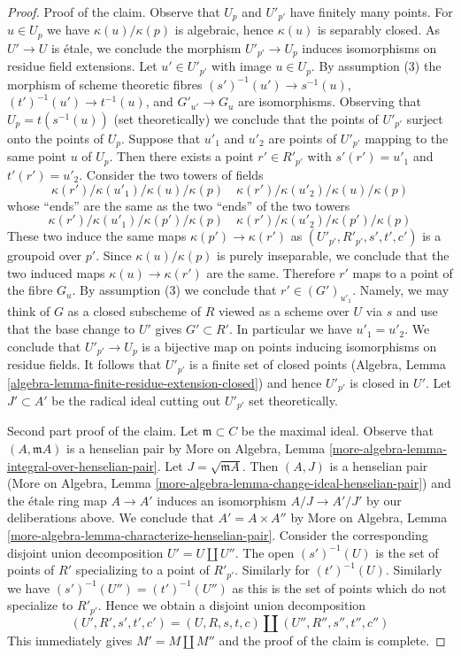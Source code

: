 \begin{proof}
\medskip\noindent
Proof of the claim. Observe that $U_p$ and $U'_{p'}$ have finitely many points.
For $u \in U_p$ we have $\kappa(u)/\kappa(p)$ is algebraic,
hence $\kappa(u)$ is separably closed.
As $U' \to U$ is \'etale, we conclude the morphism $U'_{p'} \to U_p$
induces isomorphisms on residue field extensions.
Let $u' \in U'_{p'}$ with image $u \in U_p$.
By assumption (3) the morphism of scheme theoretic fibres
$(s')^{-1}(u') \to s^{-1}(u)$,
$(t')^{-1}(u') \to t^{-1}(u)$, and
$G'_{u'} \to G_u$ are isomorphisms. Observing that $U_p = t(s^{-1}(u))$
(set theoretically) we conclude that the points of $U'_{p'}$
surject onto the points of $U_p$.
Suppose that $u'_1$ and $u'_2$ are points of $U'_{p'}$ mapping
to the same point $u$ of $U_p$. Then there exists a point
$r' \in R'_{p'}$ with $s'(r') = u'_1$ and $t'(r') = u'_2$.
Consider the two towers of fields
$$
\kappa(r')/\kappa(u'_1)/\kappa(u)/\kappa(p) \quad
\kappa(r')/\kappa(u'_2)/\kappa(u)/\kappa(p)
$$
whose ``ends'' are the same as the two ``ends'' of the two towers
$$
\kappa(r')/\kappa(u'_1)/\kappa(p')/\kappa(p) \quad
\kappa(r')/\kappa(u'_2)/\kappa(p')/\kappa(p)
$$
These two induce the same maps $\kappa(p') \to \kappa(r')$ as
$(U'_{p'}, R'_{p'}, s', t', c')$ is a groupoid over $p'$.
Since $\kappa(u)/\kappa(p)$ is purely inseparable,
we conclude that the two induced maps
$\kappa(u) \to \kappa(r')$ are the same.
Therefore $r'$ maps to a point of the fibre $G_u$.
By assumption (3) we conclude that $r' \in (G')_{u'_1}$.
Namely, we may think of $G$ as a closed subscheme of $R$
viewed as a scheme over $U$ via $s$ and use that
the base change to $U'$ gives $G' \subset R'$.
In particular we have $u'_1 = u'_2$.
We conclude that $U'_{p'} \to U_p$ is a bijective
map on points inducing isomorphisms on residue fields.
It follows that $U'_{p'}$ is a finite set of closed points
(Algebra, Lemma \ref{algebra-lemma-finite-residue-extension-closed})
and hence $U'_{p'}$ is closed in $U'$.
Let $J' \subset A'$ be the radical ideal cutting out $U'_{p'}$
set theoretically.

\medskip\noindent
Second part proof of the claim.
Let $\mathfrak m \subset C$ be the maximal ideal.
Observe that $(A, \mathfrak m A)$ is a henselian pair by
More on Algebra, Lemma \ref{more-algebra-lemma-integral-over-henselian-pair}.
Let $J = \sqrt{\mathfrak m A}$.
Then $(A, J)$ is a henselian pair
(More on Algebra, Lemma \ref{more-algebra-lemma-change-ideal-henselian-pair})
and the \'etale ring map
$A \to A'$ induces an isomorphism $A/J \to A'/J'$
by our deliberations above.
We conclude that $A' = A \times A''$ by
More on Algebra, Lemma \ref{more-algebra-lemma-characterize-henselian-pair}.
Consider the corresponding disjoint union
decomposition $U' = U \amalg U''$. The open $(s')^{-1}(U)$ is the
set of points of $R'$ specializing to a point of $R'_{p'}$.
Similarly for $(t')^{-1}(U)$. Similarly we have
$(s')^{-1}(U'') = (t')^{-1}(U'')$ as this is the set of
points which do not specialize to $R'_{p'}$.
Hence we obtain a disjoint union decomposition
$$
(U', R', s', t', c') =
(U, R, s, t, c) \amalg
(U'', R'', s'', t'', c'')
$$
This immediately gives $M' = M \amalg M''$ and the proof of the claim
is complete.


\end{proof}
